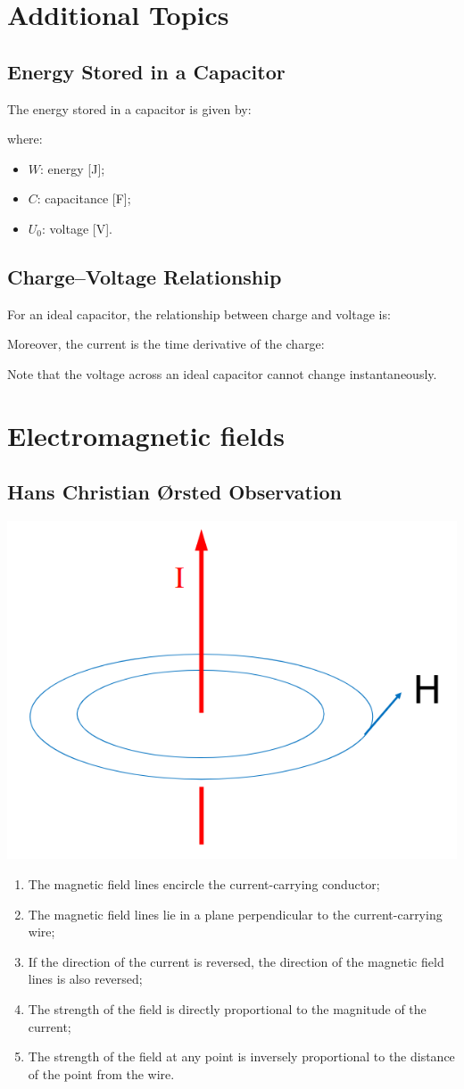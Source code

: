 \documentclass{article}
\begin{document}
\section{Additional Topics}
\subsection{Energy Stored in a Capacitor}
The energy stored in a capacitor is given by:

where:
\begin{itemize}
    \item $W$: energy [J];
    \item $C$: capacitance [F];
    \item $U_0$: voltage [V].
\end{itemize}

\subsection{Charge--Voltage Relationship}
For an ideal capacitor, the relationship between charge and voltage is:

Moreover, the current is the time derivative of the charge:

Note that the voltage across an ideal capacitor cannot change instantaneously.

\newpage
\section{Electromagnetic fields}
\subsection{Hans Christian Ørsted Observation}
\begin{center}
    \includegraphics[width=.4\textwidth]{media/observations.png}
\end{center}
\begin{enumerate}
    \item The magnetic field lines encircle the current-carrying conductor;
    \item The magnetic field lines lie in a plane perpendicular to the current-carrying wire;
    \item If the direction of the current is reversed, the direction of the magnetic field lines is also reversed;
    \item The strength of the field is directly proportional to the magnitude of the current;
    \item The strength of the field at any point is inversely proportional to the distance of the point from the wire.
\end{enumerate}
\end{document}
